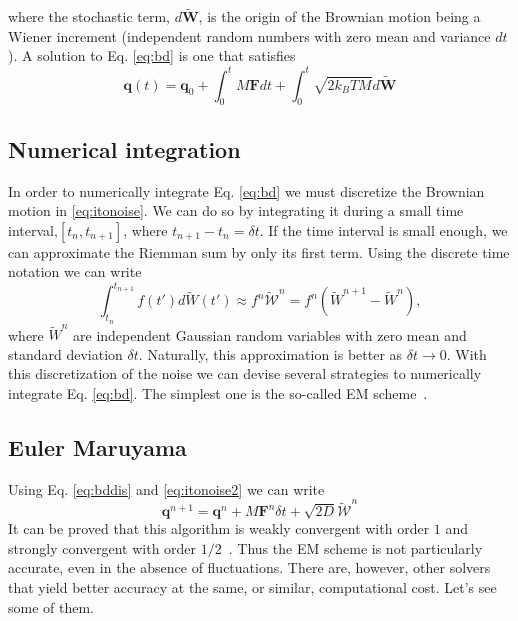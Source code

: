 \documentclass[twoside,openright,titlepage,numbers=noenddot,%
headinclude,footinclude,cleardoublepage=empty,abstract=on,
BCOR=5mm,fontsize=11pt, dvipsnames, paper=b5
]{scrreprt}
\renewcommand{\vec}[1]{\bm{#1}}
\newcommand{\dt}{\delta t}
\newcommand{\kT}{k_B T}
\newcommand{\noise}{\widetilde{W}}
\newcommand{\ppos}{q}
\begin{document}
where the stochastic term, $d\vec{\noise}$, is the origin of the Brownian motion being a Wiener increment (independent random numbers with zero mean and variance $dt$).
A solution to Eq. \eqref{eq:bd} is one that satisfies
\begin{equation}
  \label{eq:bddis}
  \vec{\ppos}(t) = \vec{\ppos}_0 + \int_0^tM\vec{F}dt + \int_0^t\sqrt{2\kT M}d\vec{\noise}
\end{equation}

\subsection*{Numerical integration}
In order to numerically integrate Eq. \eqref{eq:bd} we must discretize the Brownian motion in \eqref{eq:itonoise}. We can do so by integrating it during a small time interval,$[t_n, t_{n+1}]$, where $t_{n+1}-t_{n} = \dt$. If the time interval is small enough, we can approximate the Riemman sum by only its first term. Using the discrete time notation we can write
\begin{equation}
  \label{eq:itonoise2}
  \int_{t_n}^{t_{n+1}}f(t')d\noise(t') \approx f^n \mathcal{\noise}^n = f^n \left(\noise^{n+1} - \noise^n\right),
\end{equation}
where $\noise^n$ are independent Gaussian random variables with zero mean and standard deviation $\dt$. Naturally, this approximation is better as $\dt \rightarrow 0$.
With this discretization of the noise we can devise several strategies to numerically integrate Eq. \eqref{eq:bd}. The simplest one is the so-called \gls{EM} scheme~\cite{Desmond2001}.

\subsection*{Euler Maruyama}
Using Eq. \eqref{eq:bddis} and \eqref{eq:itonoise2} we can write
\begin{equation}
  \label{eq:eulermaruyama}
  \vec{\ppos}^{n+1} = \vec{\ppos}^n + M\vec{F}^n\dt + \sqrt{2D}\vec{\mathcal{\noise}}^n
\end{equation}
It can be proved that this algorithm is weakly convergent with order $1$ and strongly convergent with order $1/2$~\cite{Kloeden2011}. Thus the \gls{EM} scheme is not particularly accurate, even in the absence of fluctuations.
There are, however, other solvers that yield better accuracy at the same, or similar, computational cost. Let's see some of them.
\end{document}
